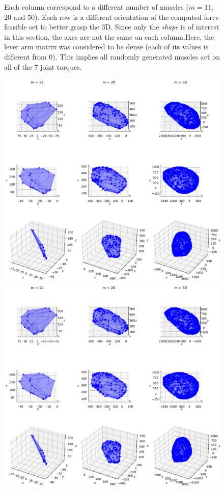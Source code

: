 \begin{figure}[!htb]
    
    \caption{Each column correspond to a different number of muscles ($m=11$, $20$ and $50$). Each row is a different orientation of the computed force feasible set to better grasp the 3D. 
    Since only the \emph{shape} is of interest in this section, the axes are not the same on each column.Here, the lever arm matrix was considered to be dense (each of its values is different from $0$). This implies all randomly generated muscles act on all of the $7$ joint torques.
    }
    \label{fig:example_ellipsoidal_zonotope_multijoints}
\end{figure}

\begin{figure}[!htb]
    \captionsetup{justification=centering}
    \begin{minipage}{1\linewidth}
        \centering
        \includegraphics[trim={0 700 0 0},clip, width=0.9\linewidth]{img/chapter_3/zonotopes_looks_like_ellipsoids_2.pdf}
    \end{minipage}
    \begin{minipage}{1\linewidth}
        \centering
        \includegraphics[trim={0 500 0 60},clip, width=0.9\linewidth]{img/chapter_3/zonotopes_looks_like_ellipsoids_2.pdf}

\end{minipage}
\end{figure}
